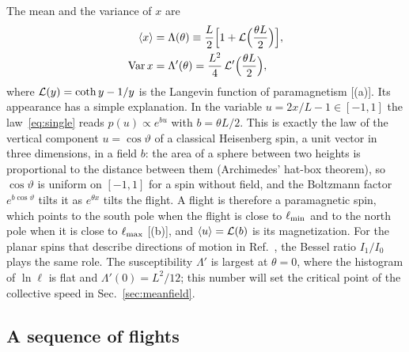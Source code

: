 The mean and the variance of $x$ are
\begin{equation}
\begin{aligned}
\langle x\rangle&=\Lambda(\theta)\equiv\frac L2\Big[1+\mathcal{L}\Big(\frac{\theta L}2\Big)\Big],\\
\mathrm{Var}\,x&=\Lambda'(\theta)=\frac{L^2}{4}\,\mathcal{L}'\Big(\frac{\theta L}2\Big),
\end{aligned}
\label{eq:langevin}
\end{equation}
where $\mathcal{L}(y)=\coth y-1/y$ is the Langevin function of paramagnetism [(a)]. Its appearance has a simple explanation. In the variable $u=2x/L-1\in[-1,1]$ the law~\eqref{eq:single} reads $p(u)\propto e^{bu}$ with $b=\theta L/2$. This is exactly the law of the vertical component $u=\cos\vartheta$ of a classical Heisenberg spin, a unit vector in three dimensions, in a field $b$: the area of a sphere between two heights is proportional to the distance between them (Archimedes' hat-box theorem), so $\cos\vartheta$ is uniform on $[-1,1]$ for a spin without field, and the Boltzmann factor $e^{b\cos\vartheta}$ tilts it as $e^{\theta x}$ tilts the flight. A flight is therefore a paramagnetic spin, which points to the south pole when the flight is close to $\ell_{\min}$ and to the north pole when it is close to $\ell_{\max}$ [(b)], and $\langle u\rangle=\mathcal{L}(b)$ is its magnetization. For the planar spins that describe directions of motion in Ref.~\cite{Agliari2024}, the Bessel ratio $I_1/I_0$ plays the same role. The susceptibility $\Lambda'$ is largest at $\theta=0$, where the histogram of $\ln\ell$ is flat and $\Lambda'(0)=L^2/12$; this number will set the critical point of the collective speed in Sec.~\ref{sec:meanfield}.

\subsection{A sequence of flights}\label{sec:path}

